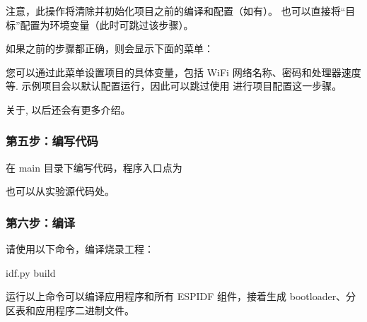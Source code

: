 \documentclass[a4paper,12pt,english]{sphinxmanual}
\begin{document}
\sphinxAtStartPar
注意，此操作将清除并初始化项目之前的编译和配置（如有）。 也可以直接将“目标”配置为环境变量（此时可跳过该步骤）。

\sphinxAtStartPar
如果之前的步骤都正确，则会显示下面的菜单：

\sphinxAtStartPar
{}

\sphinxAtStartPar
您可以通过此菜单设置项目的具体变量，包括 Wi\sphinxhyphen{}Fi 网络名称、密码和处理器速度等.  示例项目会以默认配置运行，因此可以跳过使用  进行项目配置这一步骤。

\sphinxAtStartPar
关于, 以后还会有更多介绍。


\subsubsection{第五步：编写代码}
\label{\detokenize{exp-esp32/ide/esp-idf-cli:id9}}
\sphinxAtStartPar
在 main 目录下编写代码，程序入口点为

\sphinxAtStartPar
也可以从实验源代码处{\hyperref[\detokenize{reference::doc}]{}}。


\subsubsection{第六步：编译}
\label{\detokenize{exp-esp32/ide/esp-idf-cli:id10}}
\sphinxAtStartPar
请使用以下命令，编译烧录工程：

\begin{sphinxVerbatim}[commandchars=\\\{\}]
idf.py build
\end{sphinxVerbatim}

\sphinxAtStartPar
运行以上命令可以编译应用程序和所有 ESP\sphinxhyphen{}IDF 组件，接着生成 bootloader、分区表和应用程序二进制文件。
\end{document}
